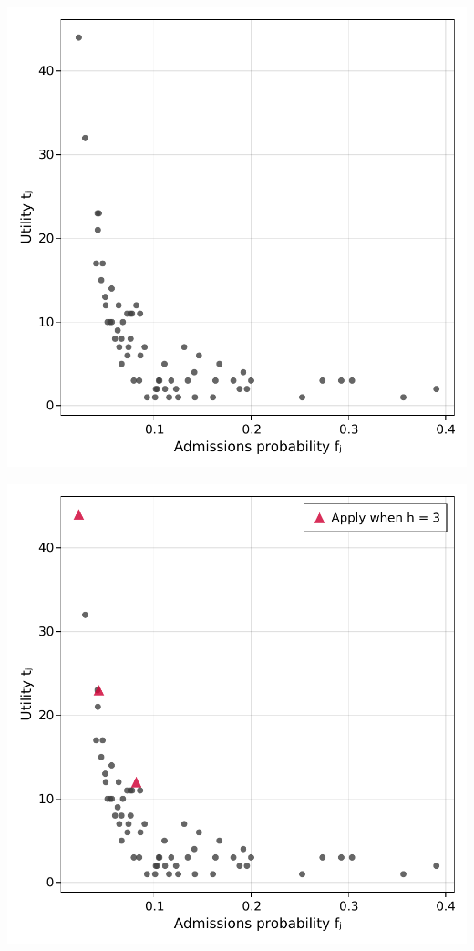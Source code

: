 \documentclass[11pt,slidestop,compress,mathserif,notheorems]{beamer}
\theoremstyle{definition}
\theoremstyle{definition}
\begin{document}
\begin{frame}[plain]{}
\begin{center}
\includegraphics[height=\textheight]{plots/samplemarket.pdf}
\end{center}
\end{frame}





\begin{frame}[plain]{}
\begin{center}
\includegraphics[height=\textheight]{plots/samplemarket-soln.pdf}
\end{center}
\end{frame}
\end{document}
